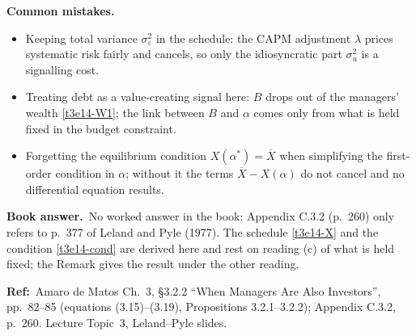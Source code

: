 \documentclass[11pt,a4paper]{article}
\newcommand{\bookans}{\par\medskip\noindent\textbf{Book answer.}~}
\newcommand{\refbib}{\par\smallskip\noindent\textbf{Ref:}~}
\newcommand{\pitfalls}{\par\medskip\noindent\textbf{Common mistakes.}}
\begin{document}
\pitfalls
\begin{itemize}
  \item Keeping total variance $\sigma_\varepsilon^2$ in the schedule: the CAPM adjustment $\lambda$ prices systematic risk fairly and cancels, so only the idiosyncratic part $\sigma_u^2$ is a signalling cost.
  \item Treating debt as a value-creating signal here: $B$ drops out of the managers' wealth \eqref{t3e14-W1}; the link between $B$ and $\alpha$ comes only from what is held fixed in the budget constraint.
  \item Forgetting the equilibrium condition $X(\alpha^*)=\overline X$ when simplifying the first-order condition in $\alpha$; without it the terms $\overline X-X(\alpha)$ do not cancel and no differential equation results.
\end{itemize}

\bookans No worked answer in the book: Appendix C.3.2 (p.~260) only refers to p.~377 of Leland and Pyle
(1977). The schedule \eqref{t3e14-X} and the condition \eqref{t3e14-cond} are derived here and rest on reading
(c) of what is held fixed; the Remark gives the result under the other reading.

\refbib{Amaro de Matos Ch.~3, \S3.2.2 ``When Managers Are Also Investors'', pp.~82--85 (equations
(3.15)--(3.19), Propositions 3.2.1--3.2.2); Appendix C.3.2, p.~260. Lecture Topic~3, Leland--Pyle slides.}
\end{document}
